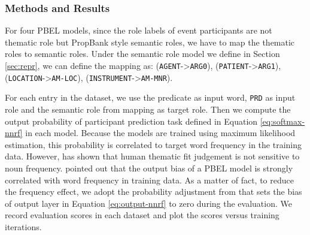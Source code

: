 \documentclass[a4paper]{article}
\begin{document}
\subsubsection{Methods and Results}  \label{sec:method-thematic}
For four PBEL models, since the role labels of event participants are not thematic role but PropBank style semantic roles, we have to map the thematic roles to semantic roles. Under the semantic role model we define in Section \ref{sec:repr}, we can define the mapping as: (\texttt{AGENT}->\texttt{ARG0}), (\texttt{PATIENT}->\texttt{ARG1}), (\texttt{LOCATION}->\texttt{AM-LOC}), (\texttt{INSTRUMENT}->\texttt{AM-MNR}). 

For each entry in the dataset, we use the predicate as input word, \texttt{PRD} as input role and the semantic role from mapping as target role. Then we compute the output probability of participant prediction task defined in Equation \eqref{eq:softmax-nnrf} in each model. Because the models are trained using maximum likelihood estimation, this probability is correlated to target word frequency in the training data. However, \citet{greenberg2015verb} has shown that human thematic fit judgement is not sensitive to noun frequency. \citet{tilk2016event} pointed out that the output bias of a PBEL model is strongly correlated with word frequency in training data. As a matter of fact, to reduce the frequency effect, we adopt the probability adjustment from  that sets the bias of output layer in Equation \eqref{eq:output-nnrf} to zero during the evaluation. We record evaluation scores in each dataset and plot the scores versus training iterations. 
\end{document}
